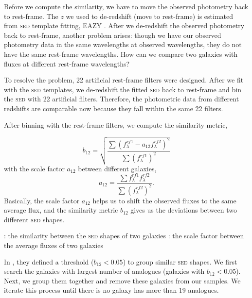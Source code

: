 \documentclass{ar-1col}
\begin{document}
Before we compute the similarity, we have to move the observed photometry back to rest-frame.
The $z$ we used to de-redshift (move to rest-frame) is estimated from \textsc{sed} template fitting, EAZY \citep{Brammer2008}.
After we de-redshift the observed photometry back to rest-frame, another problem arises: though we have our observed photometry data in the same wavelengths at observed wavelengths, they do not have the same rest-frame wavelengths.
How can we compare two galaxies with fluxes at different rest-frame wavelengths?

To resolve the problem, 22 artificial rest-frame filters were designed.
After we fit with the \textsc{sed} templates, we de-redshift the fitted \textsc{sed} back to rest-frame and bin the \textsc{sed} with 22 artificial filters.
Therefore, the photometric data from different redshifts are comparable now because they fall within the same 22 filters.

After binning with the rest-frame filters, we compute the similarity metric,

\begin{equation}
    b_{12} = \sqrt{
            \frac{ 
                \sum{ (f^{rf1}_\lambda - a_{12} f^{rf2}_\lambda )^2 } 
            }{
                \sum{ (f^{rf1}_\lambda)^2 }
            }
    }
    \label{eq:similarity}
\end{equation}
with the scale factor $a_{12}$ between different galaxies,
\begin{equation}
    a_{12} = \frac{\sum{ f^{rf1}_\lambda f^{rf2}_\lambda }}{ \sum{ (f^{rf2}_\lambda )^2 } }.
    \label{eq:scale}
\end{equation}
Basically, the scale factor $a_{12}$ helps us to shift the observed fluxes to the same average flux, and the similarity metric $b_{12}$ gives us the deviations between two different \textsc{sed} shapes.

\begin{marginnote}
    : the similarity between the \textsc{sed} shapes of two galaxies
     : the scale factor between the average fluxes of two galaxies
\end{marginnote}

In \citet{Forrest2018}, they defined a threshold ($ b_{12} < 0.05 $) to group similar \textsc{sed} shapes. 
We first search the galaxies with largest number of analogues (galaxies with $b_{12} < 0.05$).
Next, we group them together and remove these galaxies from our samples.
We iterate this process until there is no galaxy has more than 19 analogues. 
\end{document}
